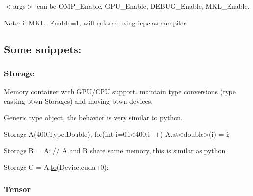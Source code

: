 $<$args$>$ can be O\+M\+P\+\_\+\+Enable, G\+P\+U\+\_\+\+Enable, D\+E\+B\+U\+G\+\_\+\+Enable, M\+K\+L\+\_\+\+Enable.

Note\+: if M\+K\+L\+\_\+\+Enable=1, will enforce using icpc as compiler.

\subsection*{Some snippets\+:}

\subsubsection*{Storage}


\begin{DoxyItemize}
\item Memory container with G\+P\+U/\+C\+PU support. maintain type conversions (type casting btwn Storages) and moving btwn devices.
\item Generic type object, the behavior is very similar to python. 
\begin{DoxyCode}
Storage A(400,Type.Double);
\textcolor{keywordflow}{for}(\textcolor{keywordtype}{int} i=0;i<400;i++)
    A.at<\textcolor{keywordtype}{double}>(i) = i;

Storage B = A; \textcolor{comment}{// A and B share same memory, this is similar as python }

Storage C = A.\hyperlink{classcytnx_1_1Tensor_acf7f697a9434f9bc98a7d00a555ee982}{to}(Device.cuda+0); 
\end{DoxyCode}

\end{DoxyItemize}

\subsubsection*{Tensor}


